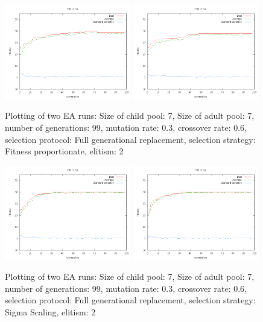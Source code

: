 \documentclass[11pt]{article}
\begin{document}
\begin{figure}[ht]
\begin{center}
\mbox{\includegraphics[width=0.49\textwidth]{images/fit1.png}}
\mbox{\includegraphics[width=0.49\textwidth]{images/fit2.png}}
\end{center}
\caption{Plotting of two EA runs:
Size of child pool: 7,
Size of adult pool: 7,
number of generations: 99,
mutation rate: 0.3,
crossover rate: 0.6,
selection protocol: Full generational replacement,
selection strategy: Fitness proportionate,
elitism: 2}
\label{fig:5}
\end{figure}


\begin{figure}[ht]
\begin{center}
\mbox{\includegraphics[width=0.49\textwidth]{images/sig1.png}}
\mbox{\includegraphics[width=0.49\textwidth]{images/sig2.png}}
\end{center}
\caption{Plotting of two EA runs:
Size of child pool: 7,
Size of adult pool: 7,
number of generations: 99,
mutation rate: 0.3,
crossover rate: 0.6,
selection protocol: Full generational replacement,
selection strategy: Sigma Scaling,
elitism: 2}
\label{fig:6}
\end{figure}
\end{document}
